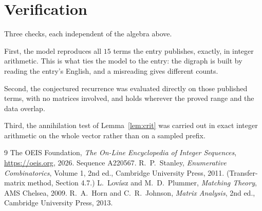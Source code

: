 \documentclass[11pt,a4paper]{article}
\theoremstyle{plain}
\theoremstyle{definition}
\begin{document}
\section{Verification}

Three checks, each independent of the algebra above.

First, the model reproduces all $15$ terms the entry publishes, exactly, in integer
arithmetic. This is what ties the model to the entry: the digraph is built by reading the
entry's English, and a misreading gives different counts.

Second, the conjectured recurrence was evaluated directly on those published terms, with no
matrices involved, and holds wherever the proved range and the data overlap.

Third, the annihilation test of Lemma~\ref{lem:crit} was carried out in exact integer
arithmetic on the whole vector rather than on a sampled prefix.

\begin{thebibliography}{9}
 The OEIS Foundation, \emph{The On-Line Encyclopedia of Integer
Sequences}, \url{https://oeis.org}, 2026. Sequence A220567.
 R.~P.~Stanley, \emph{Enumerative Combinatorics}, Volume 1, 2nd ed.,
Cambridge University Press, 2011. (Transfer-matrix method, Section 4.7.)
 L.~Lov\'asz and M.~D.~Plummer, \emph{Matching Theory}, AMS Chelsea,
2009.
 R.~A.~Horn and C.~R.~Johnson, \emph{Matrix Analysis}, 2nd ed., Cambridge
University Press, 2013.
\end{thebibliography}
\end{document}

